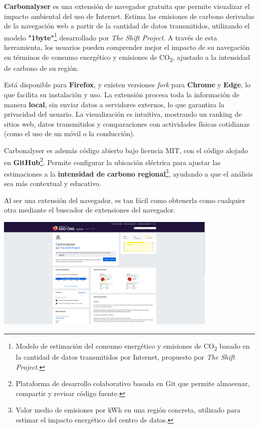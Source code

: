 \documentclass[12pt,a4paper]{report}
\begin{document}
\textbf{Carbonalyser} es una extensión de navegador gratuita que permite visualizar el impacto ambiental del uso de Internet. Estima las emisiones de carbono derivadas de la navegación web a partir de la cantidad de datos transmitidos, utilizando el modelo \textbf{"1byte"}\footnote{Modelo de estimación del consumo energético y emisiones de CO\textsubscript{2} basado en la cantidad de datos transmitidos por Internet, propuesto por \textit{The Shift Project}.} desarrollado por \textit{The Shift Project}. A través de esta herramienta, los usuarios pueden comprender mejor el impacto de su navegación en términos de consumo energético y emisiones de CO\textsubscript{2}, ajustado a la intensidad de carbono de su región.

Está disponible para \textbf{Firefox}, y existen versiones \textit{fork} para
\textbf{Chrome} y \textbf{Edge}, lo que facilita su instalación y uso. La
extensión procesa toda la información de manera \textbf{local}, sin enviar
datos a servidores externos, lo que garantiza la privacidad del usuario. La
visualización es intuitiva, mostrando un ranking de sitios web, datos
transmitidos y comparaciones con actividades físicas cotidianas (como el uso de
un móvil o la conducción).

Carbonalyser es además código abierto bajo licencia MIT, con el código alojado
en \textbf{GitHub}\footnote{Plataforma de desarrollo colaborativo basada en Git que permite almacenar, compartir y revisar
código fuente.}. Permite configurar la ubicación eléctrica para ajustar las
estimaciones a la \textbf{intensidad de carbono regional}\footnote{Valor medio de emisiones por kWh en una región concreta, utilizado para estimar el impacto energético del centro de datos.}, ayudando a que el análisis
sea más contextual y educativo.

Al ser una extensión del navegador, es tan fácil como obtenerla como cualquier
otra mediante el buscador de extensiones del navegador.

\begin{center}
  \includegraphics[width=0.8\textwidth]{imagenes/Carbonalyser_1.png}
\end{center}
\end{document}
